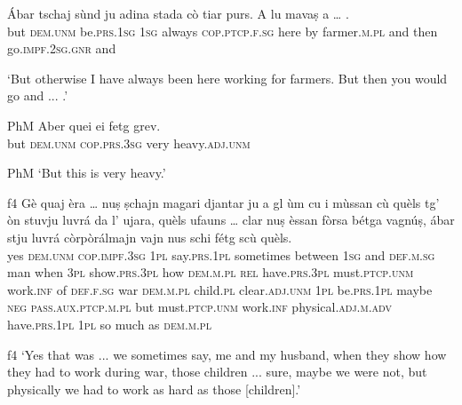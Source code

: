 \largerpage
\begin{linenumbers}
	\gll  Ábar tschaj sùnd ju adina stada cò tiar purs. A lu mavaṣ a … .  \\
	but \textsc{dem.unm} be.\textsc{prs.1sg} \textsc{1sg} always \textsc{cop.ptcp.f.sg} here by farmer.\textsc{m.pl} and then go.\textsc{impf.2sg.gnr} and\\
\end{linenumbers}
\medskip
\glt `But otherwise I have always been here working for farmers. But then you would go and ... .'
\medskip

\begin{linenumbers}
	\gll {\ob}PhM{\cb} Aber quei ei fetg grev.    \\
	{} but \textsc{dem.unm} \textsc{cop.prs.3sg} very heavy.\textsc{adj.unm}\\
\end{linenumbers}
\medskip
\glt {\ob}PhM{\cb} `But this is very heavy.'

\clearpage

\begin{linenumbers}
	\gll {\ob}f4{\cb} Gè quaj èra … nuṣ ṣchajn magari djantar ju a gl ùm cu i mùssan cù quèls tg’ òn stuvju luvrá da l’ ujara, quèls ufauns … clar nuṣ èssan fòrsa bétga vagnúṣ, ábar stju luvrá còrpòrálmajn vajn nus schi fétg scù quèls.\\
{}	yes \textsc{dem.unm} \textsc{cop.impf.3sg} {}  \textsc{1pl} say.\textsc{prs.1pl} sometimes between \textsc{1sg} and \textsc{def.m.sg} man when \textsc{3pl} show.\textsc{prs.3pl} how \textsc{dem.m.pl} \textsc{rel} have.\textsc{prs.3pl} must.\textsc{ptcp.unm} work.\textsc{inf} of \textsc{def.f.sg} war \textsc{dem.m.pl} child.\textsc{pl} {} clear\textsc{.adj.unm} \textsc{1pl} be.\textsc{prs.1pl} maybe \textsc{neg} \textsc{pass.aux.ptcp.m.pl} but must.\textsc{ptcp.unm} work.\textsc{inf} physical.\textsc{adj.m.adv} have.\textsc{prs.1pl} \textsc{1pl} so much as \textsc{dem.m.pl}\\
\end{linenumbers}
\medskip
\glt {\ob}f4{\cb} `Yes that was ... we sometimes say, me and my husband, when they show how they had to work during war, those children ... sure, maybe we were not, but physically we had to work as hard as those [children].'
\medskip

